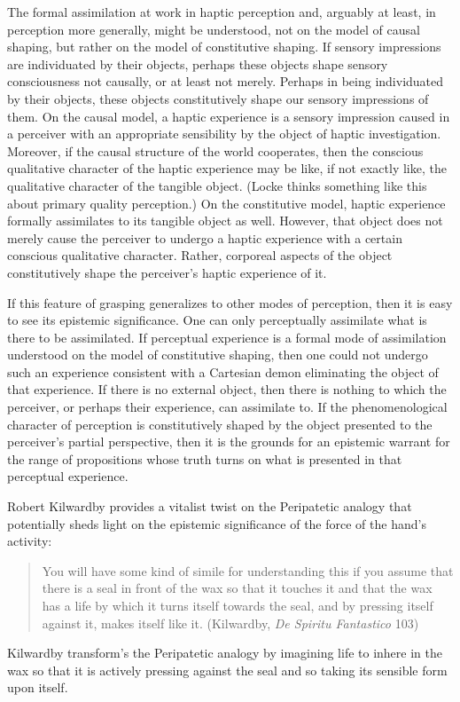 \documentclass[12pt]{article}
\begin{document}
The formal assimilation at work in haptic perception and, arguably at least, in perception more generally, might be understood, not on the model of causal shaping, but rather on the model of constitutive shaping. If sensory impressions are individuated by their objects, perhaps these objects shape sensory consciousness not causally, or at least not merely. Perhaps in being individuated by their objects, these objects constitutively shape our sensory impressions of them. On the causal model, a haptic experience is a sensory impression caused in a perceiver with an appropriate sensibility by the object of haptic investigation. Moreover, if the causal structure of the world cooperates, then the conscious qualitative character of the haptic experience may be like, if not exactly like, the qualitative character of the tangible object. (Locke thinks something like this about primary quality perception.) On the constitutive model, haptic experience formally assimilates to its tangible object as well. However, that object does not merely cause the perceiver to undergo a haptic experience with a certain conscious qualitative character. Rather, corporeal aspects of the object constitutively shape the perceiver's haptic experience of it. 


If this feature of grasping  generalizes to other modes of perception, then it is easy to see its epistemic significance. One can only perceptually assimilate what is there to be assimilated. If perceptual experience is a formal mode of assimilation understood on the model of constitutive shaping, then one could not undergo such an experience consistent with a Cartesian demon eliminating the object of that experience. If there is no external object, then there is nothing to which the perceiver, or perhaps their experience, can assimilate to. If the phenomenological character of perception is constitutively shaped by the object presented to the perceiver's partial perspective, then it is the grounds for an epistemic warrant for the range of propositions whose truth turns on what is presented in that perceptual experience.

Robert Kilwardby provides a vitalist twist on the Peripatetic analogy that potentially sheds light on the epistemic significance of the force of the hand's activity:
\begin{quote}
	You will have some kind of simile for understanding this if you assume that there is a seal in front of the wax so that it touches it and that the wax has a life by which it turns itself towards the seal, and by pressing itself against it, makes itself like it. (Kilwardby, \emph{De Spiritu Fantastico} 103)
\end{quote}
Kilwardby transform's the Peripatetic analogy by imagining life to inhere in the wax so that it is actively pressing against the seal and so taking its sensible form upon itself.
\end{document}
